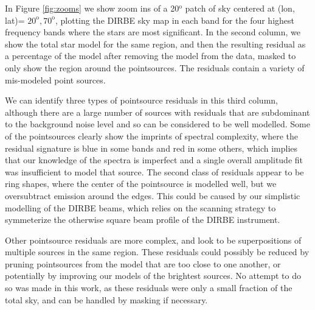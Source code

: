 \documentclass{aa}
\begin{document}
In Figure \ref{fig:zooms} we show zoom ins of a 20$^\mathrm{o}$ patch of sky centered at (lon, lat)= $20^\mathrm{o}, 70^\mathrm{o}$, plotting the DIRBE sky map in each band for the four highest frequency bands where the stars are most significant. In the second column, we show the total star model for the same region, and then the resulting residual as a percentage of the model after removing the model from the data, masked to only show the region around the pointsources. The residuals contain a variety of mis-modeled point sources.

We can identify three types of pointsource residuals in this third column, although there are a large number of sources with residuals that are subdominant to the background noise level and so can be considered to be well modelled. Some of the pointsources clearly show the imprints of spectral complexity, where the residual signature is blue in some bands and red in some others, which implies that our knowledge of the spectra is imperfect and a single overall amplitude fit was insufficient to model that source. The second class of residuals appear to be ring shapes, where the center of the pointsource is modelled well, but we oversubtract emission around the edges. This could be caused by our simplistic modelling of the DIRBE beams, which relies on the scanning strategy to symmeterize the otherwise square beam profile of the DIRBE instrument.

Other pointsource residuals are more complex, and look to be superpositions of multiple sources in the same region. These residuals could possibly be reduced by pruning pointsources from the model that are too close to one another, or potentially by improving our models of the brightest sources. No attempt to do so was made in this work, as these residuals were only a small fraction of the total sky, and can be handled by masking if necessary.
\end{document}

